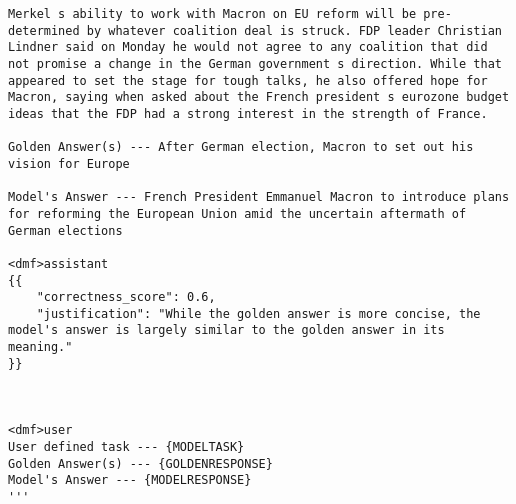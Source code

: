 \begin{lstlisting}[label=prompt-format, caption=Prompt format for the evaluator Llama 3.1 70b Instruct LLM.,xleftmargin=1cm]
Merkel s ability to work with Macron on EU reform will be pre-determined by whatever coalition deal is struck. FDP leader Christian Lindner said on Monday he would not agree to any coalition that did not promise a change in the German government s direction. While that appeared to set the stage for tough talks, he also offered hope for Macron, saying when asked about the French president s eurozone budget ideas that the FDP had a strong interest in the strength of France.

Golden Answer(s) --- After German election, Macron to set out his vision for Europe

Model's Answer --- French President Emmanuel Macron to introduce plans for reforming the European Union amid the uncertain aftermath of German elections

<dmf>assistant
{{
    "correctness_score": 0.6,
    "justification": "While the golden answer is more concise, the model's answer is largely similar to the golden answer in its meaning."
}}



<dmf>user
User defined task --- {MODELTASK}
Golden Answer(s) --- {GOLDENRESPONSE}
Model's Answer --- {MODELRESPONSE}
'''
\end{lstlisting}